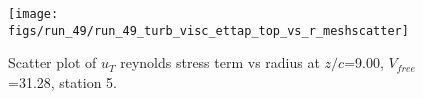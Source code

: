 \begin{figure}[H]
\centering
\texttt{[image: figs/run\_49/run\_49\_turb\_visc\_ettap\_top\_vs\_r\_meshscatter]}
\caption{Scatter plot of $
u_T$ reynolds stress term vs radius at $z/c$=9.00, $V_{free}$=31.28, station 5.}
\end{figure}


